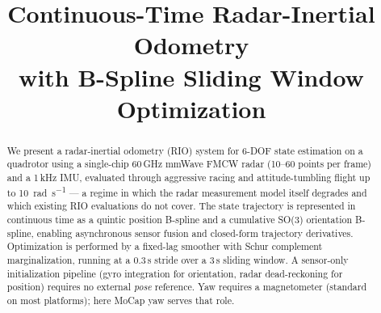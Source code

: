 \documentclass[conference]{IEEEtran}
\begin{document}
\title{Continuous-Time Radar-Inertial Odometry\\with B-Spline Sliding Window Optimization}

\author{
}

\maketitle

\begin{abstract}
We present a radar-inertial odometry (RIO) system for 6-DOF state
estimation on a quadrotor using a single-chip 60\,GHz mmWave FMCW
radar (10--60 points per frame) and a 1\,kHz IMU, evaluated through
aggressive racing and attitude-tumbling flight up to
\SI{10}{\radian\per\second} --- a regime in which the radar
measurement model itself degrades and which existing RIO evaluations
do not cover.  The state trajectory is represented in continuous time
as a quintic position B-spline and a cumulative SO(3) orientation
B-spline, enabling asynchronous sensor fusion and closed-form
trajectory derivatives.  Optimization is performed by a fixed-lag
smoother with Schur complement marginalization, running at a 0.3\,s
stride over a 3\,s sliding window.  A sensor-only initialization
pipeline (gyro integration for orientation, radar dead-reckoning for
position) requires no external \emph{pose} reference.
Yaw requires a magnetometer (standard on most platforms); here MoCap
yaw serves that role.


\end{abstract}
\end{document}
